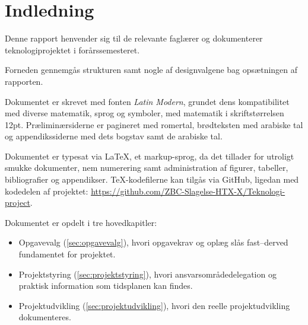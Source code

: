 \section{Indledning}
    Denne rapport henvender sig til de relevante faglærer og dokumenterer teknologiprojektet i forårssemesteret. 

    Forneden gennemgås strukturen samt nogle af designvalgene bag opsætningen af rapporten.

    Dokumentet er skrevet med fonten \textit{Latin Modern}, grundet dens kompatibilitet med diverse matematik, sprog og symboler, med matematik i skriftstørrelsen 12pt. Præliminærsiderne er pagineret med romertal, brødteksten med arabiske tal og appendikssiderne med dets bogstav samt de arabiske tal.

    Dokumentet er typesat via \LaTeX, et markup-sprog, da det tillader for utroligt smukke dokumenter, nem numerering samt administration af figurer, tabeller, bibliografier og appendikser. \TeX-kodefilerne kan tilgås via GitHub, ligedan med kodedelen af projektet: \url{https://github.com/ZBC-Slagelse-HTX-X/Teknologi-project}.

    Dokumentet er opdelt i tre hovedkapitler:
    \begin{itemize}
        \item Opgavevalg (\ref{sec:opgavevalg}), hvori opgavekrav og oplæg slås fast--derved fundamentet for projektet.
        \item Projektstyring (\ref{sec:projektstyring}), hvori ansvarsområdedelegation  og praktisk information som tidsplanen kan findes.
        \item Projektudvikling (\ref{sec:projektudvikling}), hvori den reelle projektudvikling dokumenteres.
    \end{itemize}